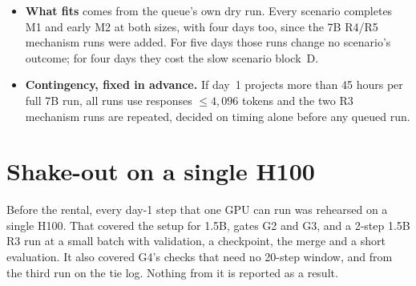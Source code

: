 \documentclass[11pt]{article}
\begin{document}
\begin{itemize}
\item \textbf{What fits} comes from the queue's own dry run. Every scenario completes M1 and early M2 at both sizes, with four days too, since the 7B R4/R5 mechanism runs were added. For five days those runs change no scenario's outcome; for four days they cost the slow scenario block~D.
\item \textbf{Contingency, fixed in advance.} If day~1 projects more than 45 hours per full 7B run, all runs use responses $\le4{,}096$ tokens and the two R3 mechanism runs are repeated, decided on timing alone before any queued run.
\end{itemize}

\section{Shake-out on a single H100}\label{sec:shakeout}
Before the rental, every day-1 step that one GPU can run was rehearsed on a single H100. That covered the setup for 1.5B, gates G2 and G3, and a 2-step 1.5B R3 run at a small batch with validation, a checkpoint, the merge and a short evaluation. It also covered G4's checks that need no 20-step window, and from the third run on the tie log. Nothing from it is reported as a result.
\end{document}
